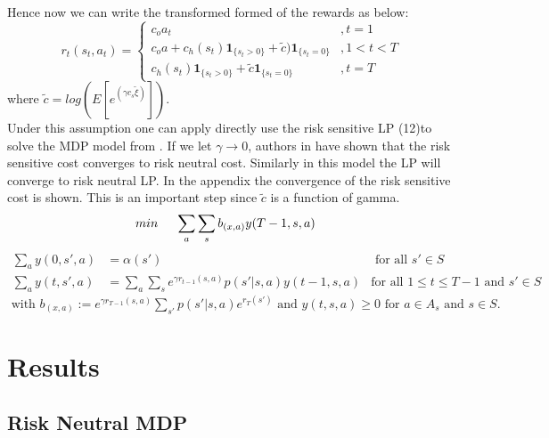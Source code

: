 \documentclass[11pt,a4paper,oneside]{report}
\begin{document}
Hence now we can write the transformed formed of the rewards as below:
\begin{equation}
r_t(s_t,a_t)=
\begin{cases}
c_{o}a_t&,t=1\\
c_{o}a + c_h(s_t)\mathbf{1}_{\lbrace s_t>0\rbrace} + \tilde{c})\mathbf{1}_{\lbrace s_t=0\rbrace}&,1<t< T\\
c_h(s_t)\mathbf{1}_{\lbrace s_t>0\rbrace} +\tilde{c}\mathbf{1}_{\lbrace s_t=0\rbrace}&,t=T
\end{cases}
\end{equation}
where $\tilde{c} = log(E[e^{(\gamma c_s \tilde{\xi})}]). $\\
Under this assumption one can apply directly use the risk sensitive LP (12)to solve the MDP model from \citep{kumar2015finite}. If we let $\gamma\rightarrow0$, authors in \citep{kumar2015finite} have shown that the risk sensitive cost converges to risk neutral cost. Similarly in this model the LP will converge to risk neutral LP. In the appendix the convergence of the risk sensitive cost is shown. This is an important step since $\tilde c$ is a function of gamma.
\pagebreak
\begin{align}
min\hspace{0.5cm} \sum_a &\sum_{s} b_{(x,a)}y(T-1,s,a)
\end{align}
\begin{align*}
\sum_a y(0,s',a)&=\alpha(s')     &\text{ for all } s'\in S \\
\sum_a y(t,s',a)&= \sum_a \sum_s e^{\gamma r_{t-1}(s,a)}p(s'|s,a)y(t-1,s,a) &\text{for all } 1\leq t\leq T-1 \text{ and } s'\in S
\end{align*}
$
\text{ with } b_{(x,a)}:= e^{\gamma r_{T-1}(s,a)}\sum_{s'} p(s'|s,a)e^{r_T(s')} \text{ and } y(t,s,a)\geq 0 \text{ for } a\in A_s \text{ and } s\in S.$


\chapter{Results}
\section{Risk Neutral MDP}
\end{document}
